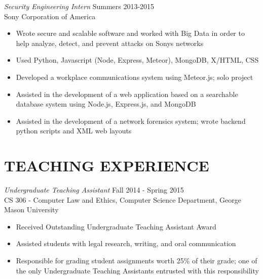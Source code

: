 \documentclass[margin, 10pt]{res} %
\begin{document}
\begin{resume}
{\sl Security Engineering Intern} \hfill Summers 2013-2015 \\
Sony Corporation of America 

\begin{itemize} \itemsep -2pt %
\item Wrote secure and scalable software and worked with Big Data in order to help analyze, detect, and prevent attacks on Sony\textsc{}s networks
\item Used Python, Javascript (Node, Express, Meteor), MongoDB, X/HTML, CSS 
\item Developed a workplace communications system using Meteor.js; solo project
\item Assisted in the development of a web application based on a searchable database system using Node.js, Express.js, and MongoDB
\item Assisted in the development of a network forensics system; wrote backend python scripts and XML web layouts
\end{itemize} 
 
 
\section{TEACHING EXPERIENCE}

{\sl Undergraduate Teaching Assistant} \hfill Fall 2014 - Spring 2015 \\
CS 306 - Computer Law and Ethics, Computer Science Department, George Mason University
\begin{itemize} \itemsep -2pt %
\item Received Outstanding Undergraduate Teaching Assistant Award 
\item Assisted students with legal research, writing, and oral communication
\item Responsible for grading student assignments worth 25\% of their grade; one of the only Undergraduate Teaching Assistants entrusted with this responsibility
\end{itemize} 



\end{resume}
\end{document}
